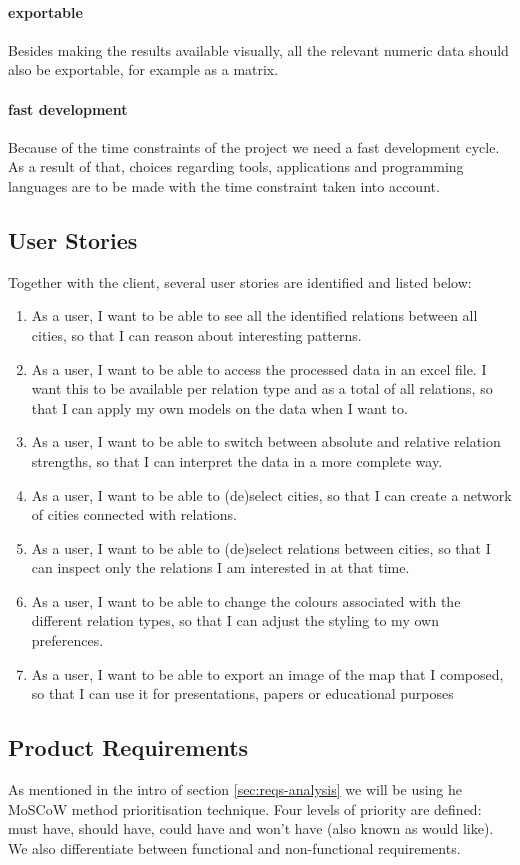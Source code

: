 \paragraph{exportable} Besides making the results available visually, all the relevant numeric data should also be exportable, for example as a matrix.
\paragraph{fast development} Because of the time constraints of the project we need a fast development cycle. As a result of that, choices regarding tools, applications and programming languages are to be made with the time constraint taken into account.

\subsection{User Stories}
Together with the client, several user stories are identified and listed below:
\begin{enumerate}
    \item As a user, I want to be able to see all the identified relations between all cities, so that I can reason about interesting patterns.
    \item As a user, I want to be able to access the processed data in an excel file. I want this to be available per relation type and as a total of all relations, so that I can apply my own models on the data when I want to.
    \item As a user, I want to be able to switch between absolute and relative relation strengths, so that I can interpret the data in a more complete way.
    \item As a user, I want to be able to (de)select cities, so that I can create a network of cities connected with relations.
    \item As a user, I want to be able to (de)select relations between cities, so that I can inspect only the relations I am interested in at that time.
    \item As a user, I want to be able to change the colours associated with the different relation types, so that I can adjust the styling to my own preferences.
    \item As a user, I want to be able to export an image of the map that I composed, so that I can use it for presentations, papers or educational purposes
\end{enumerate}


\subsection{Product Requirements}\label{sec:reqs}
As mentioned in the intro of section \ref{sec:reqs-analysis} we will be using he MoSCoW method prioritisation technique. Four levels of priority are defined: must have, should have, could have and won't have (also known as would like). We also differentiate between functional and non-functional requirements. 

